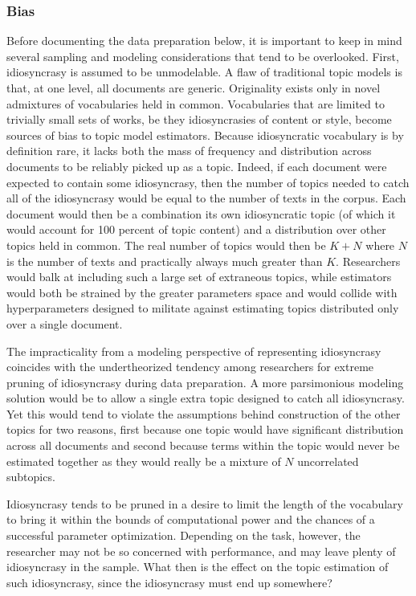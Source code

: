 \documentclass[]{book}
\theoremstyle{definition}
\theoremstyle{definition}
\theoremstyle{definition}
\theoremstyle{remark}
\begin{document}
\hypertarget{bias}{%
\subsubsection{Bias}\label{bias}}

Before documenting the data preparation below, it is important to keep
in mind several sampling and modeling considerations that tend to be
overlooked. First, idiosyncrasy is assumed to be unmodelable. A flaw of
traditional topic models is that, at one level, all documents are
generic. Originality exists only in novel admixtures of vocabularies
held in common. Vocabularies that are limited to trivially small sets of
works, be they idiosyncrasies of content or style, become sources of
bias to topic model estimators. Because idiosyncratic vocabulary is by
definition rare, it lacks both the mass of frequency and distribution
across documents to be reliably picked up as a topic. Indeed, if each
document were expected to contain some idiosyncrasy, then the number of
topics needed to catch all of the idiosyncrasy would be equal to the
number of texts in the corpus. Each document would then be a combination
its own idiosyncratic topic (of which it would account for 100 percent
of topic content) and a distribution over other topics held in common.
The real number of topics would then be \(K + N\) where \(N\) is the
number of texts and practically always much greater than \(K\).
Researchers would balk at including such a large set of extraneous
topics, while estimators would both be strained by the greater
parameters space and would collide with hyperparameters designed to
militate against estimating topics distributed only over a single
document.

The impracticality from a modeling perspective of representing
idiosyncrasy coincides with the undertheorized tendency among
researchers for extreme pruning of idiosyncrasy during data preparation.
A more parsimonious modeling solution would be to allow a single extra
topic designed to catch all idiosyncrasy. Yet this would tend to violate
the assumptions behind construction of the other topics for two reasons,
first because one topic would have significant distribution across all
documents and second because terms within the topic would never be
estimated together as they would really be a mixture of \(N\)
uncorrelated subtopics.

Idiosyncrasy tends to be pruned in a desire to limit the length of the
vocabulary to bring it within the bounds of computational power and the
chances of a successful parameter optimization. Depending on the task,
however, the researcher may not be so concerned with performance, and
may leave plenty of idiosyncrasy in the sample. What then is the effect
on the topic estimation of such idiosyncrasy, since the idiosyncrasy
must end up somewhere?
\end{document}
